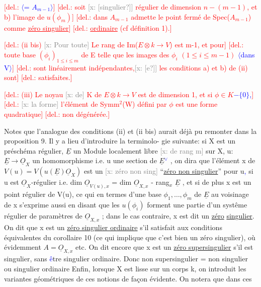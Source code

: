 \documentclass[11pt]{article}
\newcommand{\hand}[1]{\textcolor{blue}{#1}}
\newcommand{\inserted}[2][]{\textcolor{blue}{$\langle$#2$\rangle$}}
\newcommand{\deleted}[1]{\textcolor{red}{[\textsf{del.:} #1]}}
\newcommand{\xout}[1]{\textcolor{gray}{[\textsf{x:} #1]}}
\newcommand{\uline}[1]{\underline{#1}}
\newcommand{\unsure}[1]{[#1?]}
\begin{document}
\deleted{\inserted[typed]{= $A_{m-1}$}}
\deleted{soit \xout{\unsure{singulier}} régulier de dimension $n-(m-1)$, et b) l'image de $u(\phi_m)$}
\deleted{dans $A_{m-1}$ admette le point fermé de Spec($A_{m-1}$) comme \uline{zéro singulier}}
\deleted{\uline{ordinaire} (cf définition 1).}

\deleted{(ii bis) \xout{Pour toute} Le rang de Im($E\otimes k \to V$) est m-1, et pour}
\deleted{toute base $(\phi_i)_{1\leq i\leq m}$ de E telle que les images des $\phi_i$ $(1\leq i\leq m-1)$ \inserted[typed]{dans V}}
\deleted{sont linéairement indépendantes,\xout{\unsure{e}} les conditions a) et b) de (ii) sont}
\deleted{satisfaites.}

\deleted{(iii) Le noyau \xout{de} K de $E\otimes k \to V$ est de dimension 1, et si $\phi\in K$\hand{$-\{0\}$,}}
\deleted{\xout{la forme} l'élément de Symm$^2$(W) défini par $\phi$ est une forme quadratique}
\deleted{non dégénérée.}

Notes que l'analogue des conditions (ii) et (ii bis) aurait déjà
pu remonter dans la proposition 9. Il y a lieu d'introduire la terminolo-%
gie suivante: si X est un préschéma régulier, $\underline{E}$ un Module localement libre
\xout{de rang m} sur X, u: $\underline{E}\to\underline{O}_X$ un homomorphisme i.e. u une section de
$\underline{E}$\hand{$^\vee$} , on dira que l'élément x de $V(u)=V(u(\underline{E})\underline{O}_X)$ est un \xout{zéro non sing}
``\uline{zéro non singulier}'' pour u\hand{,} si u est $\underline{O}_X$-régulier i.e. dim $\underline{O}_{V(u),x}$
= dim $\underline{O}_{X,x}$ - rang$_x$ $\underline{E}$ , et si de plus x est un point régulier de V(u),
ce qui en termes d'une base $\phi_1,\ldots,\phi_m$ de $\underline{E}$ au voisinage de x s'exprime
aussi en disant que les $u(\phi_i)$ forment une partie d'un systême régulier
de paramètres de $\underline{O}_{X,x}$ ; dans le cas contraire, x est dit un \uline{zéro}
\uline{singulier}. On dit que x est un \uline{zéro singulier ordinaire} s'il satisfait
aux conditions équivalentes du corollaire 10 (ce qui implique que c'est
bien un zéro singulier), où évidemment $A=\underline{O}_{X,x}$ etc. On dit encore que
x est un \uline{zéro supersingulier} s'il est singulier, sans \hand{\^{e}}tre singulier
ordinaire. Donc non supersingulier = non singulier ou singulier ordinaire
Enfin, lorsque X est lisse sur un corps k, on introduit les variantes
géométriques de ces notions de façon évidente. On notera que dans ces
\end{document}
